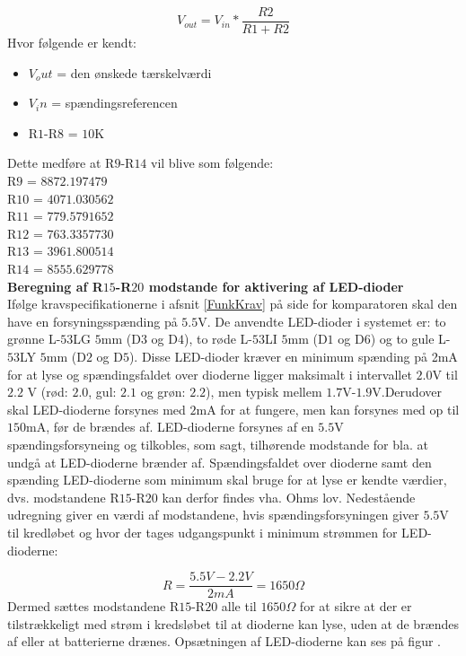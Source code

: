 \begin{equation}
V_{out}=V_{in}*\dfrac{R2}{R1+R2}
\end{equation}
Hvor følgende er kendt:
\begin{itemize}
\item $V_out$ = den ønskede tærskelværdi
\item $V_in$ = spændingsreferencen
\item R$1$-R$8$ = $10$K
\end{itemize}

Dette medføre at R$9$-R$14$ vil blive som følgende:\\
R$9$ = $8872.197479$\\
R$10$ = $4071.030562$ \\
R$11$ = $779.5791652$ \\
R$12$ = $763.3357730$ \\
R$13$ = $3961.800514$ \\
R$14$ = $8555.629778$ \\


\noindent\textbf{Beregning af R$15$-R$20$ modstande for aktivering af LED-dioder} \\
Ifølge kravspecifikationerne i afsnit \ref{FunkKrav}  på side \pageref{FunkKrav} for komparatoren skal den have en forsyningsspænding på  $5.5$V. De anvendte LED-dioder i systemet er: to grønne L-$53$LG $5$mm (D$3$  og D$4$), to røde L-$53$LI $5$mm (D$1$ og D$6$) og to gule L-$53$LY $5$mm (D$2$ og D$5$). Disse LED-dioder kræver en minimum spænding på 2mA for at lyse og spændingsfaldet over dioderne ligger maksimalt i intervallet $2.0$V til $2.2$ V (rød: $2.0$, gul: $2.1$ og grøn: $2.2$), men typisk mellem $1.7$V-$1.9$V.Derudover skal LED-dioderne forsynes med $2$mA for at fungere, men kan forsynes med op til $150$mA, før de brændes af. LED-dioderne forsynes af en $5.5$V spændingsforsyneing og tilkobles, som sagt, tilhørende modstande for bla. at undgå at LED-dioderne brænder af. Spændingsfaldet over dioderne samt den spænding LED-dioderne som minimum skal bruge for at lyse er kendte værdier, dvs. modstandene R$15$-R$20$ kan derfor findes vha. Ohms lov. Nedestående udregning giver en værdi af modstandene, hvis spændingsforsyningen giver $5.5$V til kredløbet og hvor der tages udgangspunkt i  minimum strømmen for LED-dioderne:

\begin{equation}
R = \dfrac{5.5V - 2.2V}{2mA} = 1650\Omega
\end{equation}
\noindent Dermed sættes modstandene R$15$-R$20$ alle til $1650\Omega$ for at sikre at der er tilstrækkeligt med strøm i kredsløbet til at dioderne kan lyse, uden at de brændes af eller at batterierne drænes. Opsætningen af LED-dioderne kan ses på figur .

